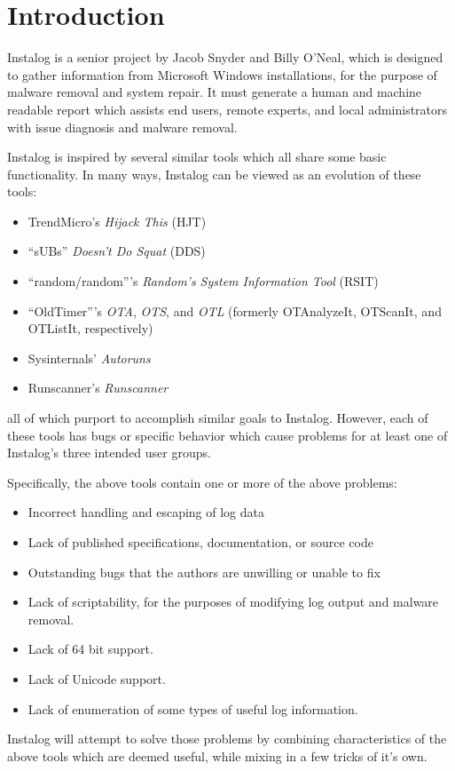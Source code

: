 \section{Introduction}
Instalog is a senior project by Jacob Snyder and Billy O'Neal, which is designed
to gather information from Microsoft Windows installations, for the purpose of
malware removal and system repair.  It must generate a human and machine
readable report which assists end users, remote experts, and local
administrators with issue diagnosis and malware removal.

Instalog is inspired by several similar tools which all share some basic
functionality.  In many ways, Instalog can be viewed as an evolution of
these tools:
\begin{itemize}
    \item TrendMicro's {\em Hijack This} (HJT)
    \item ``sUBs'' {\em Doesn't Do Squat} (DDS)
    \item ``random/random'''s {\em Random's System Information Tool} (RSIT)
    \item ``OldTimer'''s {\em OTA}, {\em OTS}, and {\em OTL} (formerly
    OTAnalyzeIt, OTScanIt, and OTListIt, respectively)
    \item Sysinternals' {\em Autoruns}
    \item Runscanner's {\em Runscanner}
\end{itemize}
all of which purport to accomplish similar goals to Instalog. However, each of
these tools has bugs or specific behavior which cause problems for at least one
of Instalog's three intended user groups.

Specifically, the above tools contain one or more of the above problems:
\begin{itemize}
    \item Incorrect handling and escaping of log data
    \item Lack of published specifications, documentation, or source code
    \item Outstanding bugs that the authors are unwilling or unable to fix
    \item Lack of scriptability, for the purposes of modifying log output and
    malware removal.
    \item Lack of 64 bit support.
    \item Lack of Unicode support.
    \item Lack of enumeration of some types of useful log information.
\end{itemize}
Instalog will attempt to solve those problems by combining characteristics of
the above tools which are deemed useful, while mixing in a few tricks of it's
own.

